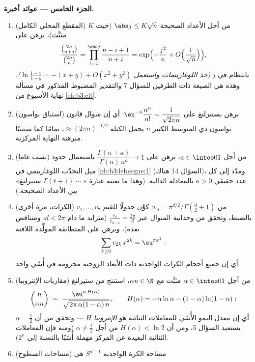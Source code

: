\begin{problem}
\medskip
\noindent\textbf{الجزء الخامس --- عوائد أخيرة.}
\begin{enumerate}[resume]
  \item (المقطع المحلي الكامل) من أجل الأعداد الصحيحة $\abs j \leq
        K\sqrt n$
        (حيث $K$ مثبَّت)، برهن على
        \[
        \frac{\binom{2n}{n+j}}{\binom{2n}{n}} =
        \prod_{i=1}^{\abs j}\frac{n - i + 1}{n + i}
        = \exp\Bigl(-\frac{j^2}n +
        O\Bigl(\frac1{\sqrt n}\Bigr)\Bigr),
        \]
        بانتظام في $j$ \emph{(خذ اللوغاريتمات واستعمل $\ln
        \frac{1-x}{1+y} = -(x + y) + O(x^2 + y^2)$)}.
        وهذه هي الصيغة ذات الطرفين للسؤال 7 والتقدير المضبوط
        المذكور في مسألة نهاية الأسبوع من \cref{ch:b3:clt}.
  \item (استباق بواسون) برهن بستيرلنغ على $\eu^{-n}\dfrac{n^n}{n!} \sim \dfrac1{\sqrt{2\pi n}}$: أي إن منوال
        قانون بواسون ذي المتوسط الكبير $n$ يحمل الكتلة $\approx (2\pi n)^{-1/2}$،
        تمامًا كما ستتنبّأ مبرهنة النهاية المركزية.
  \item (نسب غاما) من أجل $a \in \intoo01$، برهن على $\dfrac{\Gamma(n + a)}{\Gamma(n)\,n^a} \to 1$
        باستعمال حدود ميل التحدّب اللوغاريتمي في \cref{pb:b3:lebesgue:1}
        (السؤال 14 هناك)، ومدّد إلى كل عدد حقيقي $a > 0$
        بالمعادلة الدالية. (وهذا ما تعنيه عبارة «$\Gamma(t+1) \sim$
        ستيرلنغ» بين الأعداد الصحيحة.)
  \item (الكرات، مرة أخرى) من $v_d = \pi^{d/2}/\Gamma(\frac d2
        + 1)$: كوِّن جدولًا للقيم $v_1, \dots, v_7$
        بالضبط، وتحقق من وحدانية المنوال عبر $\frac{v_d}{v_{d-2}} = \frac{2\pi}d$ (متزايد ما
        دام $d < 2\pi$، ومتناقص بعده)، وبرهن على المتطابقة
        المولِّدة اللافتة
        \[
        \sum_{k\geq0}v_{2k}\,x^{2k} = \eu^{\pi x^2} :
        \]
        أي إن جميع أحجام الكرات الواحدية ذات الأبعاد الزوجية
        محزومة في أُسّي واحد.
  \item (مقاربات الإنتروبيا) من أجل $\alpha \in \intoo01$ مثبَّت مع $\alpha n \in \N$،
        استنتج من ستيرلنغ
        \[
        \binom{n}{\alpha n} \;\sim\;
        \frac{\eu^{n\,H(\alpha)}}
        {\sqrt{2\pi\,\alpha(1-\alpha)\,n}},
        \qquad
        H(\alpha) = -\alpha\ln\alpha -
        (1-\alpha)\ln(1-\alpha) :
        \]
        أي إن معدل النمو الأُسّي للمعاملات الثنائية هو
        \emph{الإنتروبيا} $H$ --- وتحقق من أن $\alpha =
        \frac12$ يستعيد
        السؤال 5، ومن أن $H(\alpha) <
        \ln2$ من أجل $\alpha \neq \frac12$ (ومنه فإن
        المعاملات الثنائية البعيدة عن المركز مهملة أُسّيًا
        بالنسبة إلى $2^n$).
  \item (مساحات السطوح) مساحة الكرة الواحدية $S^{d-1}$ هي

\end{enumerate}
\end{problem}
